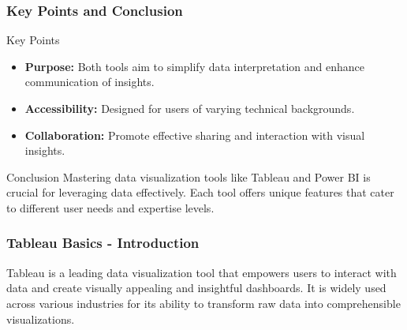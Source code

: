 \documentclass[aspectratio=169]{beamer}
\begin{document}
\begin{frame}[fragile]
    \frametitle{Key Points and Conclusion}

    \begin{block}{Key Points}
        \begin{itemize}
            \item \textbf{Purpose:} Both tools aim to simplify data interpretation and enhance communication of insights.
            \item \textbf{Accessibility:} Designed for users of varying technical backgrounds.
            \item \textbf{Collaboration:} Promote effective sharing and interaction with visual insights.
        \end{itemize}
    \end{block}

    \begin{block}{Conclusion}
        Mastering data visualization tools like Tableau and Power BI is crucial for leveraging data effectively. Each tool offers unique features that cater to different user needs and expertise levels.
    \end{block}
\end{frame}

\begin{frame}[fragile]
    \frametitle{Tableau Basics - Introduction}
    Tableau is a leading data visualization tool that empowers users to interact with data and create visually appealing and insightful dashboards. 
    It is widely used across various industries for its ability to transform raw data into comprehensible visualizations.
\end{frame}
\end{document}
